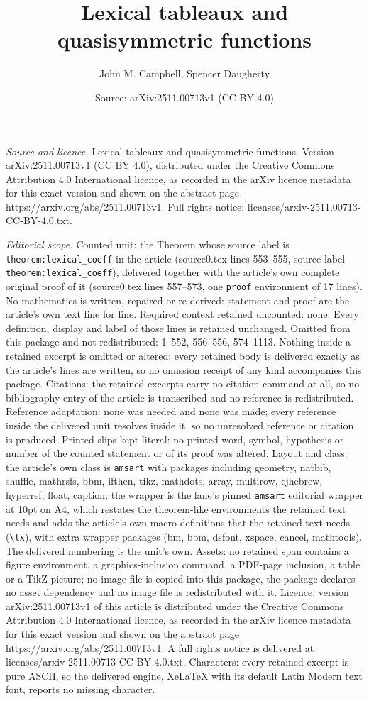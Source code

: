 \documentclass[10pt,a4paper]{amsart}
\title[Lexical tableaux and quasisymmetric functions]{Lexical tableaux and quasisymmetric functions}
\author{John M. Campbell, Spencer Daugherty}
\date{Source: arXiv:2511.00713v1 (CC BY 4.0)}
\begin{document}
\maketitle

\noindent\emph{Source and licence.} Lexical tableaux and quasisymmetric functions. Version arXiv:2511.00713v1 (CC BY 4.0), distributed under the Creative Commons Attribution 4.0 International licence, as recorded in the arXiv licence metadata for this exact version and shown on the abstract page https://arxiv.org/abs/2511.00713v1. Full rights notice: licenses/arxiv-2511.00713-CC-BY-4.0.txt.\par\smallskip

\noindent\textit{Editorial scope.} Counted unit: the Theorem whose source label is \texttt{theorem:lexical\_coeff} in the article (source0.tex lines 553--555, source label \texttt{theorem:lexical\_coeff}), delivered together with the article's own complete original proof of it (source0.tex lines 557--573, one \texttt{proof} environment of 17 lines). No mathematics is written, repaired or re-derived: statement and proof are the article's own text line for line. Required context retained uncounted: none. Every definition, display and label of those lines is retained unchanged. Omitted from this package and not redistributed: 1--552, 556--556, 574--1113. Nothing inside a retained excerpt is omitted or altered: every retained body is delivered exactly as the article's lines are written, so no omission receipt of any kind accompanies this package. Citations: the retained excerpts carry no citation command at all, so no bibliography entry of the article is transcribed and no reference is redistributed. Reference adaptation: none was needed and none was made; every reference inside the delivered unit resolves inside it, so no unresolved reference or citation is produced. Printed slips kept literal: no printed word, symbol, hypothesis or number of the counted statement or of its proof was altered. Layout and class: the article's own class is \texttt{amsart} with packages including geometry, natbib, shuffle, mathrsfs, bbm, ifthen, tikz, mathdots, array, multirow, cjhebrew, hyperref, float, caption; the wrapper is the lane's pinned \texttt{amsart} editorial wrapper at 10pt on A4, which restates the theorem-like environments the retained text needs and adds the article's own macro definitions that the retained text needs (\texttt{\textbackslash lx}), with extra wrapper packages (bm, bbm, dsfont, xspace, cancel, mathtools). The delivered numbering is the unit's own. Assets: no retained span contains a figure environment, a graphics-inclusion command, a PDF-page inclusion, a table or a TikZ picture; no image file is copied into this package, the package declares no asset dependency and no image file is redistributed with it. Licence: version arXiv:2511.00713v1 of this article is distributed under the Creative Commons Attribution 4.0 International licence, as recorded in the arXiv licence metadata for this exact version and shown on the abstract page https://arxiv.org/abs/2511.00713v1. A full rights notice is delivered at licenses/arxiv-2511.00713-CC-BY-4.0.txt. Characters: every retained excerpt is pure ASCII, so the delivered engine, XeLaTeX with its default Latin Modern text font, reports no missing character.
\end{document}
